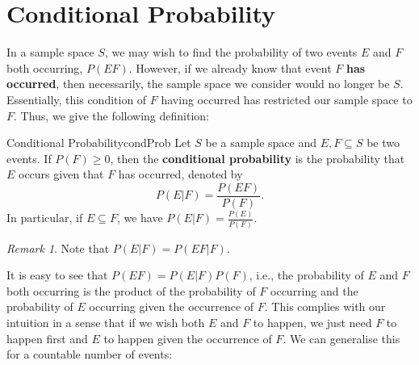 \documentclass[math]{amznotes}
\theoremstyle{remark}
\newtheorem*{remark}{Remark}
\newcommand{\0}{\mathbf{0}}
\newcommand{\1}{\mathbf{1}}
\begin{document}
\section{Conditional Probability}
In a sample space $S$, we may wish to find the probability of two events $E$ and $F$ both occurring, $P(EF)$. However, if we already know that event $F$ \textbf{has occurred}, then necessarily, the sample space we consider would no longer be $S$. Essentially, this condition of $F$ having occurred has restricted our sample space to $F$. Thus, we give the following definition:
\begin{dfnbox}{Conditional Probability}{condProb}
    Let $S$ be a sample space and $E, F \subseteq S$ be two events. If $P(F) \geq 0$, then the {\color{red} \textbf{conditional probability}} is the probability that $E$ occurs given that $F$ has occurred, denoted by
    \begin{equation*}
        P(E|F) = \frac{P(EF)}{P(F)}.
    \end{equation*}
    In particular, if $E \subseteq F$, we have $P(E|F) = \frac{P(E)}{P(F)}$.
\end{dfnbox}
\begin{notebox}
    \begin{remark}
        Note that $P(E|F) = P(EF|F)$.
    \end{remark}
\end{notebox}
It is easy to see that $P(EF) = P(E|F)P(F)$, i.e., the probability of $E$ and $F$ both occurring is the product of the probability of $F$ occurring and the probability of $E$ occurring given the occurrence of $F$. This complies with our intuition in a sense that if we wish both $E$ and $F$ to happen, we just need $F$ to happen first and $E$ to happen given the occurrence of $F$. We can generalise this for a countable number of events:
\end{document}
